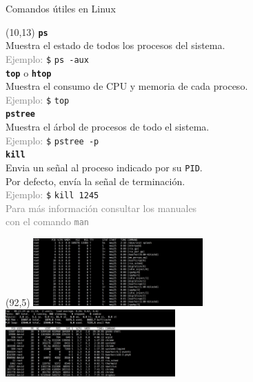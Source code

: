 \documentclass[aspectratio=169]{beamer}
\begin{document}
\begin{frame}[t,fragile]{Comandos útiles en Linux}
    \begin{textblock}{90}(10,13)
    \small
    \textcolor{naranjauca}{\textbf{\texttt{ps}}}\\
    Muestra el estado de todos los procesos del sistema.\\
    \textcolor{gray}{Ejemplo:} \verb|$| \texttt{ps -aux} {\scriptsize \keys{\return}}\\
    \vspace{0.3cm}
    \textcolor{naranjauca}{\textbf{\texttt{top}}} o \textcolor{naranjauca}{\textbf{\texttt{htop}}}\\
    Muestra el consumo de CPU y memoria de cada proceso.\\
    \textcolor{gray}{Ejemplo:} \verb|$| \texttt{top} {\scriptsize \keys{\return}}\\
    \vspace{0.3cm}
    \textcolor{naranjauca}{\textbf{\texttt{pstree}}}\\
    Muestra el árbol de procesos de todo el sistema.\\
    \textcolor{gray}{Ejemplo:} \verb|$| \texttt{pstree -p} {\scriptsize \keys{\return}}\\
    \vspace{0.3cm}
    \textcolor{naranjauca}{\textbf{\texttt{kill}}}\\
    Envia un señal al proceso indicado por su \texttt{PID}.\\ Por defecto, envía la señal de terminación.\\
    \textcolor{gray}{Ejemplo:} \verb|$| \texttt{kill 1245} {\scriptsize \keys{\return}}\\
    \vspace{0.3cm}
    \footnotesize
    \textcolor{gray}{Para más información consultar los manuales\\ con el comando \texttt{man}}
    \end{textblock}
    \begin{textblock}{90}(92,5)
    \includegraphics[width=6.5cm]{img/ps.png}\\ \vspace{0.2cm}
    \includegraphics[width=6.5cm]{img/top.png}\\ \vspace{0.2cm}

\end{textblock}
\end{frame}
\end{document}
